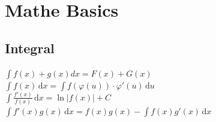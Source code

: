 \documentclass[]{article}
\begin{document}
\section{Mathe Basics}
\subsection{Integral}
$\int f(x) + g(x) dx = F(x) + G(x)$\\
$\int \! f(x) \, \mathrm{d}x = \int \! f(\varphi(u)) \cdot \varphi'(u) \, \mathrm{d}u$\\
$\int \! \frac{f'(x)}{f(x)} \, \mathrm{d}x = \ln |f(x)| + C$\\
$\int \! f'(x) g(x) \, \mathrm{d}x = f(x) g(x) - \int \! f(x) g'(x) \, \mathrm{d}x$
\end{document}
